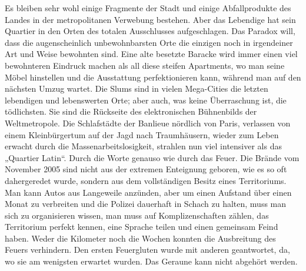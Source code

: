 Es bleiben sehr wohl einige Fragmente der Stadt und einige
Abfallprodukte des Landes in der metropolitanen Verwebung bestehen.
Aber das Lebendige hat sein Quartier in den Orten des totalen
Ausschlusses aufgeschlagen. Das Paradox will, dass die
augenscheinlich unbewohnbarsten Orte die einzigen noch in
irgendeiner Art und Weise bewohnten sind. Eine alte besetzte
Baracke wird immer einen viel bewohnteren Eindruck machen als all
diese steifen Apartments, wo man seine Möbel hinstellen und die
Ausstattung perfektionieren kann, während man auf den nächsten
Umzug wartet. Die Slums sind in vielen Mega-Cities die letzten
lebendigen und lebenswerten Orte; aber auch, was keine Überraschung
ist, die tödlichsten. Sie sind die Rückseite des elektronischen
Bühnenbilds der Weltmetropole. Die Schlafstädte der Banlieue
nördlich von Paris, verlassen von einem Kleinbürgertum auf der
Jagd nach Traumhäusern, wieder zum Leben erwacht durch die
Massenarbeitslosigkeit, strahlen nun viel intensiver als das
„Quartier Latin“. Durch die Worte genauso wie durch das Feuer.
Die Brände vom November 2005 sind nicht aus der extremen Enteignung
geboren, wie es so oft dahergeredet wurde, sondern aus dem
vollständigen Besitz eines Territoriums. Man kann Autos aus
Langeweile anzünden, aber um einen Aufstand über einen Monat zu
verbreiten und die Polizei dauerhaft in Schach zu halten, muss man
sich zu organisieren wissen, man muss auf Komplizenschaften zählen,
das Territorium perfekt kennen, eine Sprache teilen und einen
gemeinsam Feind haben. Weder die Kilometer noch die Wochen konnten
die Ausbreitung des Feuers verhindern. Den ersten Feuergluten wurde
mit anderen geantwortet, da, wo sie am wenigsten erwartet wurden.
Das Geraune kann nicht abgehört werden.

\extrapar{}

